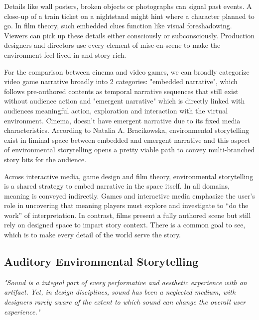             Details like wall posters, broken objects or photographs can signal past events. A close-up of a train ticket on a nightstand might hint where a character planned to go. In film theory, such embedded clues function like visual foreshadowing. Viewers can pick up these details either consciously or subconsciously. Production designers and directors use every element of mise-en-scene to make the environment feel lived-in and story-rich.\par
            
            For the comparison between cinema and video games, we can broadly categorize video game narrative broadly into 2 categories: "embedded narrative", which follows pre-authored contents as temporal narrative sequences that still exist without audience action and "emergent narrative" which is directly linked with audiences meaningful action, exploration and interaction with the virtual environment\cite{Liminal_Space_Between_Embedded_and_Emergent_Narrative}. Cinema, doesn't have emergent narrative due to its fixed media characteristics. According to Natalia A. Bracikowska, environmental storytelling exist in liminal space between embedded and emergent narrative\cite{Liminal_Space_Between_Embedded_and_Emergent_Narrative} and this aspect of environmental storytelling opens a pretty viable path to convey multi-branched story bits for the audience.\par
            
            Across interactive media, game design and film theory, environmental storytelling is a shared strategy to embed narrative in the space itself. In all domains, meaning is conveyed indirectly. Games and interactive media emphasize the user’s role in uncovering that meaning players must explore and investigate to “do the work” of interpretation. In contrast, films present a fully authored scene but still rely on designed space to impart story context. There is a common goal to see, which is to make every detail of the world serve the story.\par
            \subsection{Auditory Environmental Storytelling}
            \emph{"Sound is a integral part of every performative and aesthetic experience with an artifact. Yet, in design disciplines, sound has been a neglected medium, with designers rarely aware of the extent to which sound can change the overall user experience."\cite{Sonic_Interaction_Design}}

